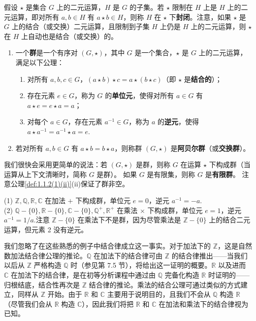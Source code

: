 假设 \(\star\) 是集合 \(G\) 上的二元运算，\(H\) 是 \(G\) 的子集。若 \(\star\) 限制在 \(H\) 上是 \(H\) 上的二元运算，即对所有 \(a, b \in H\) 有 \(a \star b \in H\)，则称 \(H\) 在 \(\star\) 下\textbf{封闭}。注意，如果 \(\star\) 是 \(G\) 上的结合（或交换）二元运算，且限制到子集 \(H\) 上仍是 \(H\) 上的二元运算，则 \(\star\) 在 \(H\) 上自动也是结合（或交换）的。

\begin{definition}\label{def:1.1.2}
\begin{enumerate}[label=(\arabic*)]
\item 一个\textbf{群}是一个有序对 \((G, \star)\)，其中 \(G\) 是一个集合，\(\star\) 是 \(G\) 上的二元运算，满足以下公理：
\begin{enumerate}
\item[(i)] 对所有 \(a, b, c \in G\)，\((a \star b) \star c = a \star (b \star c)\)（即 \(\star\) 是\textbf{结合的}）；
\item[(ii)]\label{def:1.1.2(1)(ii)} 存在元素 \(e \in G\)，称为 \(G\) 的\textbf{单位元}，使得对所有 \(a \in G\) 有 \(a \star e = e \star a = a\)；
\item[(iii)] 对每个 \(a \in G\)，存在元素 \(a^{-1} \in G\)，称为 \(a\) 的\textbf{逆元}，使得 \(a \star a^{-1} = a^{-1} \star a = e\).
\end{enumerate}
\item 若对所有 \(a, b \in G\) 有 \(a \star b = b \star a\)，则称群 \((G, \star)\) 是\textbf{阿贝尔群}（或\textbf{交换群}）。
\end{enumerate}
\end{definition}

我们很快会采用更简单的说法：若 \((G, \star)\) 是群，则称 \(G\) 在运算 \(\star\) 下构成群（当运算从上下文清晰时，简称 \(G\) 是群）。
如果 \(G\) 是有限集，则称 \(G\) 是\textbf{有限群}。
注意公理\ref{def:1.1.2(1)(ii)}(ii)保证了群非空。

\begin{example}
(1) \(\mathbb{Z}, \mathbb{Q}, \mathbb{R}, \mathbb{C}\) 在加法 \(+\) 下构成群，单位元 \(e = 0\)，逆元 \(a^{-1} = -a\).\\
(2) \(\mathbb{Q} - \{0\}, \mathbb{R} - \{0\}, \mathbb{C} - \{0\}, \mathbb{Q}^+, \mathbb{R}^+\) 在乘法 \(\times\) 下构成群，单位元 \(e = 1\)，逆元 \(a^{-1} = 1/a\).注意 \(\mathbb{Z} - \{0\}\) 在乘法下不是群，因为尽管乘法是 \(\mathbb{Z} - \{0\}\) 上的结合二元运算，但元素 2 没有逆元。
\end{example}

我们忽略了在这些熟悉的例子中结合律成立这一事实。对于加法下的 \(\mathbb{Z}\)，这是自然数加法结合律公理的推论。\(\mathbb{Q}\) 在加法下的结合律可由 \(\mathbb{Z}\) 的结合律推出——当我们以后从 \(\mathbb{Z}\) 严格构造 \(\mathbb{Q}\) 时（参见第 7.5 节），将给出这一证明的概要。\(\mathbb{R}\) 以及进而 \(\mathbb{C}\) 在加法下的结合律，是在初等分析课程中通过由 \(\mathbb{Q}\) 完备化构造 \(\mathbb{R}\) 时证明的——归根结底，结合性再次是 \(\mathbb{Z}\) 结合律的推论。乘法的结合公理可通过类似的方式建立，同样从 \(\mathbb{Z}\) 开始。由于 \(\mathbb{R}\) 和 \(\mathbb{C}\) 主要用于说明目的，且我们不会从 \(\mathbb{Q}\) 构造 \(\mathbb{R}\)（尽管我们会从 \(\mathbb{R}\) 构造 \(\mathbb{C}\)），因此我们将把 \(\mathbb{R}\) 和 \(\mathbb{C}\) 在加法和乘法下的结合律视为已知。

